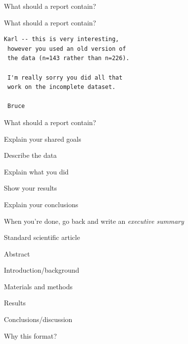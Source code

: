 \documentclass[aspectratio=169,12pt,t]{beamer}
\begin{document}
\begin{frame}[c]{What should a report contain?}

\end{frame}


\begin{frame}[c,fragile]{What should a report contain?}

\addtocounter{framenumber}{-1}

\begin{center}
\begin{minipage}[c]{9.3cm}
\begin{semiverbatim}
\lstset{basicstyle=\normalsize}
\begin{lstlisting}[linewidth=9.3cm]
 Karl -- this is very interesting,
 however you used an old version of
 the data (n=143 rather than n=226).

 I'm really sorry you did all that
 work on the incomplete dataset.

 Bruce
\end{lstlisting}
\end{semiverbatim}
\end{minipage}
\end{center}


\end{frame}

\begin{frame}[c]{What should a report contain?}

\addtocounter{framenumber}{-1}

  \bbi
\item Explain your shared goals
\item Describe the data
\item Explain what you did
\item Show your results
\item Explain your conclusions
\item When you're done, go back and write an \emph{\hilit executive
  summary}
  \ei


\end{frame}


\begin{frame}[c]{Standard scientific article}

  \bbi
\item Abstract
\item Introduction/background
\item Materials and methods
\item Results
\item Conclusions/discussion
  \ei

  \vspace{10mm}

  \centerline{\hilit Why this format?}

\end{frame}
\end{document}
